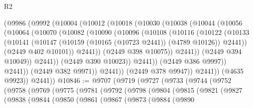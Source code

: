 \begin{lexlean}{R2}
\begin{coremodule}
                (@9986
                  (@9992
                    (@10004
                      (@10012
                        (@10018
                          (@10030
                            (@10038
                              (@10044
                                (@10056
                                  (@10064
                                    (@10070
                                      (@10082
                                        (@10090
                                          (@10096
                                            (@10108
                                              (@10116
                                                (@10122
                                                  (@10133
                                                    (@10141
                                                      (@10147
                                                        (@10159
                                                          (@10165 (@10723 @2441))
                                                          (@4789 @10126))
                                                        @2441))
                                                    (@2449 @402 @10101))
                                                  @2441))
                                              (@2449 @398 @10075))
                                            @2441))
                                        (@2449 @394 @10049))
                                      @2441))
                                  (@2449 @390 @10023))
                                @2441))
                            (@2449 @386 @9997))
                          @2441))
                      (@2449 @382 @9971))
                    @2441))
                (@2449 @378 @9947))
              @2441))
          (@4635 @9923))
        @2441))
@10846 := @9707
    (@9719
      (@9727
        (@9733
          (@9744
            (@9752
              (@9758
                (@9769
                  (@9775
                    (@9781
                      (@9792
                        (@9798
                          (@9804
                            (@9815
                              (@9821
                                (@9827
                                  (@9838
                                    (@9844
                                      (@9850
                                        (@9861
                                          (@9867
                                            (@9873
                                              (@9884
                                                (@9890

\end{coremodule}
\end{lexlean}
